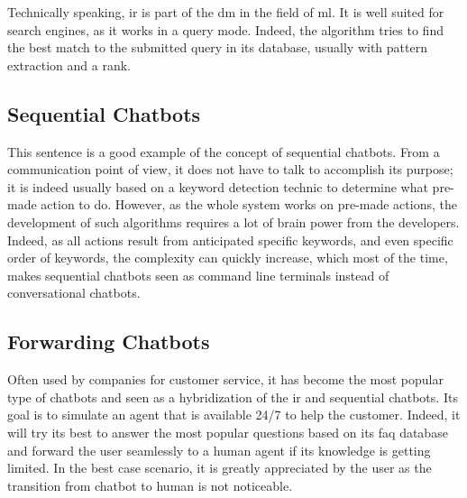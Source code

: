 Technically speaking, \gls{ir} is part of the \gls{dm} in the field of \gls{ml}. It is well suited for search engines, as it works in a query mode. Indeed, the algorithm tries to find the best match to the submitted query in its database, usually with pattern extraction and a rank. 

\subsection{Sequential Chatbots}
This sentence is a good example of the concept of sequential chatbots. From a communication point of view, it does not have to talk to accomplish its purpose; it is indeed usually based on a keyword detection technic to determine what pre-made action to do. However, as the whole system works on pre-made actions, the development of such algorithms requires a lot of brain power from the developers. Indeed, as all actions result from anticipated specific keywords, and even specific order of keywords, the complexity can quickly increase, which most of the time, makes sequential chatbots seen as command line terminals instead of conversational chatbots.

\subsection{Forwarding Chatbots}
Often used by companies for customer service, it has become the most popular type of chatbots and seen as a hybridization of the \gls{ir} and sequential chatbots. Its goal is to simulate an agent that is available 24/7 to help the customer. Indeed, it will try its best to answer the most popular questions based on its \gls{faq} database and forward the user seamlessly to a human agent if its knowledge is getting limited. In the best case scenario, it is greatly appreciated by the user as the transition from chatbot to human is not noticeable.

